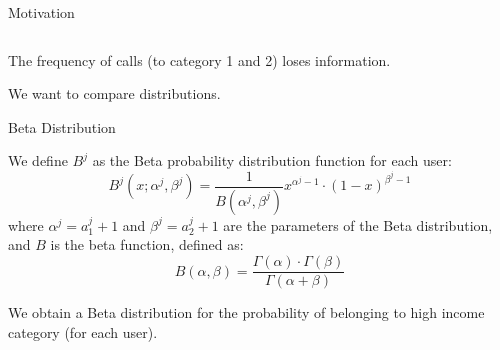 \documentclass{beamer}
\newcommand{\Beta}{B}
\begin{document}
\begin{frame}{Motivation}
\begin{columns}
\begin{column}{0.49\textwidth}
\end{column}
\end{columns}

\medskip

The frequency of calls (to category 1 and 2) loses information.

We want to compare distributions.

\end{frame}



\begin{frame}{Beta Distribution}

We define \(\Beta^j\) as the Beta probability distribution function for each user:
\begin{equation}
	\Beta^j \left( x; \alpha^j, \beta^j \right) = \frac{1}{\Beta \left( \alpha^j, \beta^j \right)} x^{\alpha^j - 1} \cdot {\left( 1 - x \right)}^{\beta^j - 1}
\label{Beta}
\end{equation}
where $\alpha^j = a^j_1 +1$ and $\beta^j = a^j_2 +1$ are the parameters of the Beta distribution,
and $\Beta$ is the beta function, defined as:
\begin{equation}
\Beta \left( \alpha, \beta \right) =
\frac{\Gamma \! \left( \alpha \right) \cdot \Gamma \! \left( \beta \right)}
{\Gamma \! \left( \alpha + \beta \right)}
\label{Beta}
\end{equation}

We obtain a Beta distribution for the probability of belonging to high income category (for each user).

\end{frame}
\end{document}
